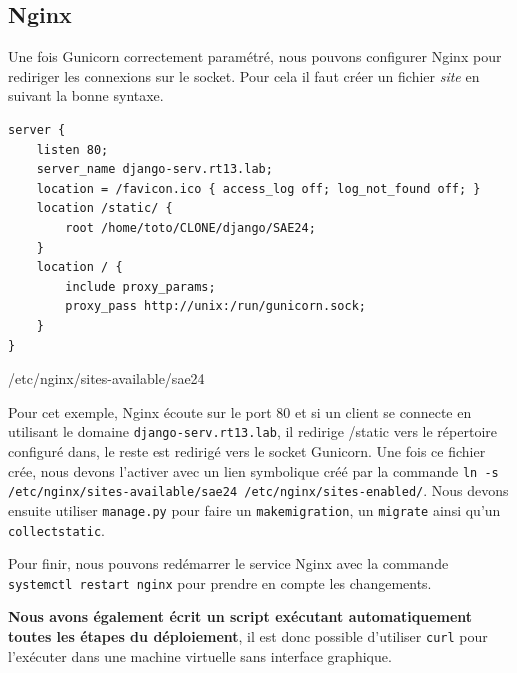 \documentclass{article}
\begin{document}
    \subsection{Nginx}
    Une fois Gunicorn correctement paramétré, nous pouvons configurer Nginx pour rediriger les connexions sur le socket. Pour cela il faut créer un fichier \emph{site} en suivant la bonne syntaxe.
    \begin{listing}[H]
        \begin{verbatim}
server {
    listen 80;
    server_name django-serv.rt13.lab;
    location = /favicon.ico { access_log off; log_not_found off; }
    location /static/ {
        root /home/toto/CLONE/django/SAE24;
    }
    location / {
        include proxy_params;
        proxy_pass http://unix:/run/gunicorn.sock;
    }
}
        \end{verbatim}
        \caption{/etc/nginx/sites-available/sae24}
        \label{code:sae24-site} 
    \end{listing}
    Pour cet exemple, Nginx écoute sur le port 80 et si un client se connecte en utilisant le domaine \verb|django-serv.rt13.lab|, il redirige /static vers le répertoire configuré dans, le reste est redirigé vers le socket Gunicorn.
    Une fois ce fichier crée, nous devons l'activer avec un lien symbolique créé par la commande \verb|ln -s /etc/nginx/sites-available/sae24 /etc/nginx/sites-enabled/|.
    Nous devons ensuite utiliser \verb|manage.py| pour faire un \verb|makemigration|, un \verb|migrate| ainsi qu'un \verb|collectstatic|.

    Pour finir, nous pouvons redémarrer le service Nginx avec la commande \verb|systemctl restart nginx| pour prendre en compte les changements. 
    
    {\bf Nous avons également écrit un script exécutant automatiquement toutes les étapes du déploiement}, il est donc possible d'utiliser \verb|curl| pour l'exécuter dans une machine virtuelle sans interface graphique.
\end{document}
